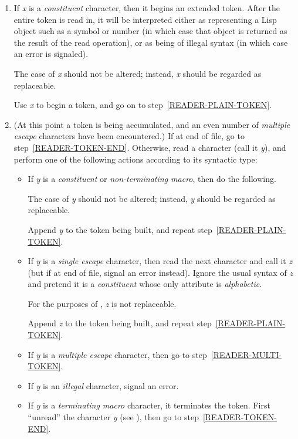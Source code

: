 \begin{enumerate}
\item
If \emph{x} is a \emph{constituent} character, then it begins an extended token.
\label{READER-CONSTITUENT}\relax
After the entire token is read in, it will be interpreted
either as representing a Lisp object such as a symbol or number
(in which case that object is returned as the result of the read operation),
or as being of illegal syntax (in which case an error is signaled).

The case of \emph{x\/} should not be altered; instead,
\emph{x} should be regarded as replaceable.

Use \emph{x} to begin a token, and go on to step~\ref{READER-PLAIN-TOKEN}.

\item
(At this point a token is being accumulated, and an even number
of \emph{multiple escape} characters have been encountered.)
If at end of file, go to step~\ref{READER-TOKEN-END}.
Otherwise, read a character (call it \emph{y}), and
perform one of the following actions according to its syntactic type:
\label{READER-PLAIN-TOKEN}
\begin{itemize}
\item
If \emph{y} is a \emph{constituent} or \emph{non-terminating macro},
then do the following.

The case of \emph{y\/} should not be altered; instead,
\emph{y} should be regarded as replaceable.

Append \emph{y} to the token being built,
and repeat step~\ref{READER-PLAIN-TOKEN}.

\item
If \emph{y} is a \emph{single escape} character, then read the next character
and call it \emph{z}
(but if at end of file, signal an error instead).
Ignore the usual syntax of \emph{z}
and pretend it is a \emph{constituent} whose only attribute is
\emph{alphabetic}.

For the purposes of , \emph{z} is not replaceable.

Append \emph{z} to the token being built,
and repeat step~\ref{READER-PLAIN-TOKEN}.

\item
If \emph{y} is a \emph{multiple escape} character,
then go to step~\ref{READER-MULTI-TOKEN}.

\item
If \emph{y} is an \emph{illegal} character, signal an error.

\item
If \emph{y} is a \emph{terminating macro} character, it terminates
the token.  First ``unread'' the character \emph{y}
(see ), then go to step~\ref{READER-TOKEN-END}.


\end{itemize}
\end{enumerate}
